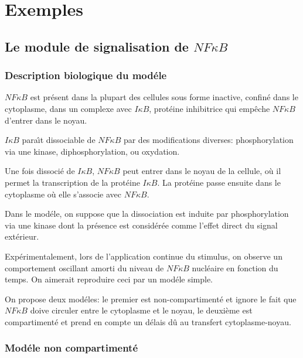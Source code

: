 \documentclass{article}
\def\magenta{\color{goldenrod}}
\begin{document}
\chapter{\magenta \textsf{\Large Exemples }}


\section{\magenta \textsf{\Large Le module de signalisation de  $NF \kappa B$ }}

\subsection{\magenta \textsf{\Large Description biologique du
mod{\'e}le}}


$NF\kappa B$ est pr{\'e}sent dans la plupart des cellules sous forme inactive,
 confin{\'e} dans le cytoplasme, dans un complexe avec $I\kappa B$,
  prot{\'e}ine inhibitrice qui emp{\^e}che $NF\kappa B$ d'entrer dans le noyau.

$I\kappa B$ para{\^\i}t dissociable de $NF\kappa B$ par des
modifications diverses:
   phosphorylation via une kinase, diphosphorylation, ou oxydation.

Une fois dissoci{\'e} de $I\kappa B$, $NF\kappa B$ peut entrer dans le
noyau de
   la cellule, o{\`u} il permet la transcription de la prot{\'e}ine $I\kappa B$. La prot{\'e}ine
   passe ensuite
   dans le cytoplasme o{\`u} elle s'associe avec $NF\kappa B$.

Dans le mod{\'e}le,
     on suppose que la dissociation est induite par phosphorylation
     via une kinase dont
     la pr{\'e}sence est consid{\'e}r{\'e}e comme l'effet direct du signal ext{\'e}rieur.


Exp{\'e}rimentalement, lors de l'application continue du stimulus, on
observe
 un comportement oscillant amorti du niveau de $NF\kappa B$ nucl{\'e}aire
 en fonction du temps. On aimerait reproduire ceci par un mod{\'e}le simple.

 On propose deux mod{\'e}les: le premier est non-compartiment{\'e} et ignore le fait que
  $NF\kappa B$ doive circuler entre le cytoplasme et le noyau, le deuxi{\`e}me est compartiment{\'e} et prend en compte un d{\'e}lais d{\^u} au transfert cytoplasme-noyau.


\subsection{\magenta \textsf{\Large Mod{\'e}le non compartiment{\'e}}}
\end{document}
